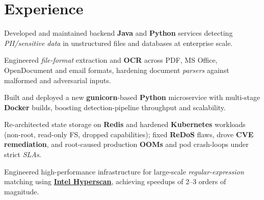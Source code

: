 \documentclass[]{openfont}
\begin{document}
\hfill
\begin{minipage}[t]{0.65\textwidth}


    \section{Experience}
    \vspace{\topsep}
    \begin{tightemize}
        \item Developed and maintained backend \textbf{Java} and \textbf{Python} services detecting \textit{PII/sensitive data} in unstructured files and databases at enterprise scale.
        \item Engineered \textit{file-format} extraction and \textbf{OCR} across PDF, MS Office, OpenDocument and email formats, hardening document \textit{parsers} against malformed and adversarial inputs.
        \item Built and deployed a new \textbf{gunicorn}-based \textbf{Python} microservice with multi-stage \textbf{Docker} builds, boosting detection-pipeline throughput and scalability.
        \item Re-architected state storage on \textbf{Redis} and hardened \textbf{Kubernetes} workloads (non-root, read-only FS, dropped capabilities); fixed \textbf{ReDoS} flaws, drove \textbf{CVE remediation}, and root-caused production \textbf{OOMs} and pod crash-loops under strict \textit{SLAs}.
    \end{tightemize}
    \sectionsep

    \begin{tightemize}
        \item Engineered high-performance infrastructure for large-scale \textit{regular-expression} matching using \href{https://www.intel.com/content/www/us/en/developer/articles/technical/introduction-to-hyperscan.html}{\textbf{Intel Hyperscan}}, achieving speedups of 2--3 orders of magnitude.
    \end{tightemize}
    \sectionsep


\end{minipage}
\end{document}
